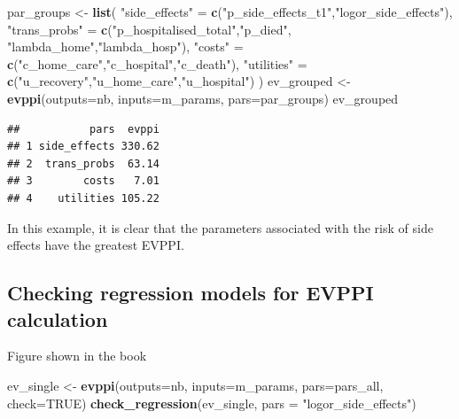 \documentclass[
]{article}
\newenvironment{Shaded}{\begin{snugshade}}{\end{snugshade}}
\newcommand{\AttributeTok}[1]{\textcolor[rgb]{0.13,0.29,0.53}{#1}}
\newcommand{\ConstantTok}[1]{\textcolor[rgb]{0.56,0.35,0.01}{#1}}
\newcommand{\FunctionTok}[1]{\textcolor[rgb]{0.13,0.29,0.53}{\textbf{#1}}}
\newcommand{\NormalTok}[1]{#1}
\newcommand{\OtherTok}[1]{\textcolor[rgb]{0.56,0.35,0.01}{#1}}
\newcommand{\StringTok}[1]{\textcolor[rgb]{0.31,0.60,0.02}{#1}}
\begin{document}
\begin{Shaded}
\begin{Highlighting}[]
\NormalTok{par\_groups }\OtherTok{\textless{}{-}} \FunctionTok{list}\NormalTok{(}
  \StringTok{"side\_effects"} \OtherTok{=} \FunctionTok{c}\NormalTok{(}\StringTok{"p\_side\_effects\_t1"}\NormalTok{,}\StringTok{"logor\_side\_effects"}\NormalTok{),}
  \StringTok{"trans\_probs"} \OtherTok{=} \FunctionTok{c}\NormalTok{(}\StringTok{"p\_hospitalised\_total"}\NormalTok{,}\StringTok{"p\_died"}\NormalTok{,}
                    \StringTok{"lambda\_home"}\NormalTok{,}\StringTok{"lambda\_hosp"}\NormalTok{),}
  \StringTok{"costs"} \OtherTok{=} \FunctionTok{c}\NormalTok{(}\StringTok{"c\_home\_care"}\NormalTok{,}\StringTok{"c\_hospital"}\NormalTok{,}\StringTok{"c\_death"}\NormalTok{),}
  \StringTok{"utilities"} \OtherTok{=} \FunctionTok{c}\NormalTok{(}\StringTok{"u\_recovery"}\NormalTok{,}\StringTok{"u\_home\_care"}\NormalTok{,}\StringTok{"u\_hospital"}\NormalTok{)}
\NormalTok{)}
\NormalTok{ev\_grouped }\OtherTok{\textless{}{-}} \FunctionTok{evppi}\NormalTok{(}\AttributeTok{outputs=}\NormalTok{nb, }\AttributeTok{inputs=}\NormalTok{m\_params, }\AttributeTok{pars=}\NormalTok{par\_groups)}
\NormalTok{ev\_grouped}
\end{Highlighting}
\end{Shaded}

\begin{verbatim}
##           pars  evppi
## 1 side_effects 330.62
## 2  trans_probs  63.14
## 3        costs   7.01
## 4    utilities 105.22
\end{verbatim}

In this example, it is clear that the parameters associated with the
risk of side effects have the greatest EVPPI.

\hypertarget{checking-regression-models-for-evppi-calculation}{%
\subsection{Checking regression models for EVPPI
calculation}\label{checking-regression-models-for-evppi-calculation}}

Figure shown in the book

\begin{Shaded}
\begin{Highlighting}[]
\NormalTok{ev\_single }\OtherTok{\textless{}{-}} \FunctionTok{evppi}\NormalTok{(}\AttributeTok{outputs=}\NormalTok{nb, }\AttributeTok{inputs=}\NormalTok{m\_params, }\AttributeTok{pars=}\NormalTok{pars\_all, }\AttributeTok{check=}\ConstantTok{TRUE}\NormalTok{)}
\FunctionTok{check\_regression}\NormalTok{(ev\_single, }\AttributeTok{pars =} \StringTok{"logor\_side\_effects"}\NormalTok{)}
\end{Highlighting}
\end{Shaded}
\end{document}
